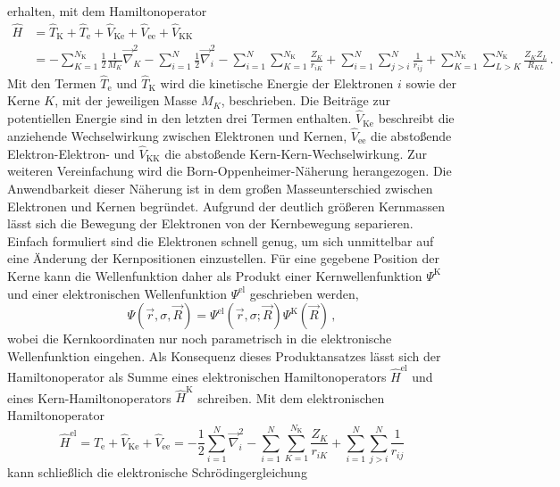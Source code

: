 erhalten, mit dem Hamiltonoperator
\begin{equation}
\begin{aligned}
  \hat{H}&=\hat{T}_{\text{K}}+\hat{T}_{\text{e}}+\hat{V}_{\text{Ke}}+\hat{V}_{\text{ee}}+\hat{V}_{\text{KK}}\\
  &=-\sum_{K=1}^{N_\text{K}}\frac{1}{2}\frac{1}{M_K}\vec{\nabla}^2_K-\sum_{i=1}^N\frac{1}{2}\vec{\nabla}^2_i-\sum_{i=1}^N\sum_{K=1}^{N_\text{K}}\frac{Z_K}{r_{iK}}+\sum_{i=1}^N\sum_{j>i}^N\frac{1}{r_{ij}}+\sum_{K=1}^{N_\text{K}}\sum_{L>K}^{N_\text{K}}\frac{Z_KZ_L}{R_{KL}}\, .
\end{aligned}
\end{equation}
Mit den Termen $\hat{T}_{\text{e}}$ und $\hat{T}_{\text{K}}$ wird die kinetische Energie der Elektronen $i$ sowie der Kerne $K$, mit der jeweiligen Masse $M_K$, beschrieben. Die Beiträge zur potentiellen Energie sind in den letzten drei Termen enthalten. $\hat{V}_{\text{Ke}}$ beschreibt die anziehende Wechselwirkung zwischen Elektronen und Kernen, $\hat{V}_{\text{ee}}$ die abstoßende Elektron-Elektron- und $\hat{V}_{\text{KK}}$ die abstoßende Kern-Kern-Wechselwirkung.
Zur weiteren Vereinfachung wird die Born-Oppenheimer-Näherung\supercite{born1927quantentheorie} herangezogen. Die Anwendbarkeit dieser Näherung ist in dem großen Masseunterschied zwischen Elektronen und Kernen begründet. Aufgrund der deutlich größeren Kernmassen lässt sich die Bewegung der Elektronen von der Kernbewegung separieren. Einfach formuliert sind die Elektronen schnell genug, um sich unmittelbar auf eine Änderung der Kernpositionen einzustellen. Für eine gegebene Position der Kerne kann die Wellenfunktion daher als Produkt einer Kernwellenfunktion $\Psi^{\text{K}}$ und einer elektronischen Wellenfunktion $\Psi^{\text{el}}$ geschrieben werden,
\begin{equation}
\Psi(\vec{r},\sigma,\vec{R})=\Psi^{\text{el}}(\vec{r},\sigma;\vec{R})\Psi^{\text{K}}(\vec{R})\, ,
\end{equation}
wobei die Kernkoordinaten nur noch parametrisch in die elektronische Wellenfunktion eingehen. Als Konsequenz dieses Produktansatzes lässt sich der Hamiltonoperator als Summe eines elektronischen Hamiltonoperators $\hat{H}^{\text{el}}$ und eines Kern-Hamiltonoperators $\hat{H}^{\text{K}}$ schreiben. Mit dem elektronischen Hamiltonoperator
\begin{equation}\label{eq:elhamilton}
  \hat{H}^{\text{el}}=\hat{T}_{\text{e}}+\hat{V}_{\text{Ke}}+\hat{V}_{\text{ee}}=-\frac{1}{2}\sum_{i=1}^N\vec{\nabla}^2_i-\sum_{i=1}^N\sum_{K=1}^{N_\text{K}}\frac{Z_K}{r_{iK}}+\sum_{i=1}^N\sum_{j>i}^N\frac{1}{r_{ij}}
\end{equation}
kann schließlich die elektronische Schrödingergleichung 

